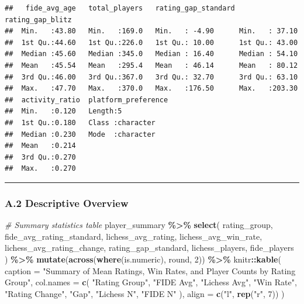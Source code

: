 \documentclass[
]{article}
\newenvironment{Shaded}{\begin{snugshade}}{\end{snugshade}}
\newcommand{\AttributeTok}[1]{\textcolor[rgb]{0.13,0.29,0.53}{#1}}
\newcommand{\CommentTok}[1]{\textcolor[rgb]{0.56,0.35,0.01}{\textit{#1}}}
\newcommand{\DecValTok}[1]{\textcolor[rgb]{0.00,0.00,0.81}{#1}}
\newcommand{\FunctionTok}[1]{\textcolor[rgb]{0.13,0.29,0.53}{\textbf{#1}}}
\newcommand{\NormalTok}[1]{#1}
\newcommand{\SpecialCharTok}[1]{\textcolor[rgb]{0.81,0.36,0.00}{\textbf{#1}}}
\newcommand{\StringTok}[1]{\textcolor[rgb]{0.31,0.60,0.02}{#1}}
\begin{document}
\begin{verbatim}
##   fide_avg_age   total_players   rating_gap_standard rating_gap_blitz
##  Min.   :43.80   Min.   :169.0   Min.   : -4.90      Min.   : 37.10  
##  1st Qu.:44.60   1st Qu.:226.0   1st Qu.: 10.00      1st Qu.: 43.00  
##  Median :45.60   Median :345.0   Median : 16.40      Median : 54.10  
##  Mean   :45.54   Mean   :295.4   Mean   : 46.14      Mean   : 80.12  
##  3rd Qu.:46.00   3rd Qu.:367.0   3rd Qu.: 32.70      3rd Qu.: 63.10  
##  Max.   :47.70   Max.   :370.0   Max.   :176.50      Max.   :203.30  
##  activity_ratio  platform_preference
##  Min.   :0.120   Length:5           
##  1st Qu.:0.180   Class :character   
##  Median :0.230   Mode  :character   
##  Mean   :0.214                      
##  3rd Qu.:0.270                      
##  Max.   :0.270
\end{verbatim}

\begin{center}\rule{0.5\linewidth}{0.5pt}\end{center}

\subsubsection{A.2 Descriptive Overview}\label{a.2-descriptive-overview}

\begin{Shaded}
\begin{Highlighting}[]
\CommentTok{\# Summary statistics table}
\NormalTok{player\_summary }\SpecialCharTok{\%\textgreater{}\%}
  \FunctionTok{select}\NormalTok{(}
\NormalTok{    rating\_group, fide\_avg\_rating\_standard, lichess\_avg\_rating,}
\NormalTok{    lichess\_avg\_win\_rate, lichess\_avg\_rating\_change, rating\_gap\_standard,}
\NormalTok{    lichess\_players, fide\_players}
\NormalTok{  ) }\SpecialCharTok{\%\textgreater{}\%}
    \FunctionTok{mutate}\NormalTok{(}\FunctionTok{across}\NormalTok{(}\FunctionTok{where}\NormalTok{(is.numeric), round, }\DecValTok{2}\NormalTok{)) }\SpecialCharTok{\%\textgreater{}\%}
\NormalTok{    knitr}\SpecialCharTok{::}\FunctionTok{kable}\NormalTok{(}
      \AttributeTok{caption =} \StringTok{"Summary of Mean Ratings, Win Rates, and Player Counts by Rating Group"}\NormalTok{,}
      \AttributeTok{col.names =} \FunctionTok{c}\NormalTok{(}
        \StringTok{"Rating Group"}\NormalTok{, }\StringTok{"FIDE Avg"}\NormalTok{, }\StringTok{"Lichess Avg"}\NormalTok{, }\StringTok{"Win Rate"}\NormalTok{,}
        \StringTok{"Rating Change"}\NormalTok{, }\StringTok{"Gap"}\NormalTok{, }\StringTok{"Lichess N"}\NormalTok{, }\StringTok{"FIDE N"}
\NormalTok{      ),}
      \AttributeTok{align =} \FunctionTok{c}\NormalTok{(}\StringTok{"l"}\NormalTok{, }\FunctionTok{rep}\NormalTok{(}\StringTok{"r"}\NormalTok{, }\DecValTok{7}\NormalTok{))}
\NormalTok{    )}
\end{Highlighting}
\end{Shaded}
\end{document}
